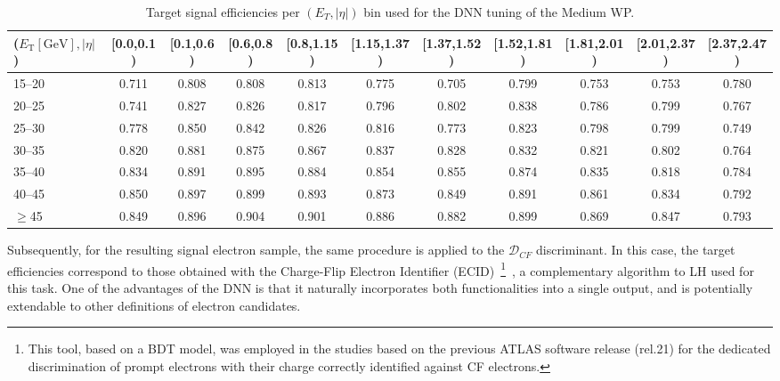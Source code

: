 \begin{table}[htbp]
  \centering
  \caption{Target signal efficiencies per $(E_T, |\eta|)$ bin used for the DNN tuning of the Medium WP.}
  \renewcommand{\arraystretch}{1.2}
  \setlength{\tabcolsep}{0.8pt}
  \scriptsize
  \begin{tabular}{lcccccccccc}
  \toprule
  ($E_{\text{T}}[\text{GeV}],|\eta|$) 
  & \tiny{[0.0,0.1)} & \tiny{[0.1,0.6)} & \tiny{[0.6,0.8)} & \tiny{[0.8,1.15)} & \tiny{[1.15,1.37)} & \tiny{[1.37,1.52)} & \tiny{[1.52,1.81)} & \tiny{[1.81,2.01)} & \tiny{[2.01,2.37)} & \tiny{[2.37,2.47)} \\
  \midrule
  \tiny{15--20}  & 0.711 & 0.808 & 0.808 & 0.813 & 0.775 & 0.705 & 0.799 & 0.753 & 0.753 & 0.780 \\
  \tiny{20--25}  & 0.741 & 0.827 & 0.826 & 0.817 & 0.796 & 0.802 & 0.838 & 0.786 & 0.799 & 0.767 \\
  \tiny{25--30}  & 0.778 & 0.850 & 0.842 & 0.826 & 0.816 & 0.773 & 0.823 & 0.798 & 0.799 & 0.749 \\
  \tiny{30--35}  & 0.820 & 0.881 & 0.875 & 0.867 & 0.837 & 0.828 & 0.832 & 0.821 & 0.802 & 0.764 \\
  \tiny{35--40}  & 0.834 & 0.891 & 0.895 & 0.884 & 0.854 & 0.855 & 0.874 & 0.835 & 0.818 & 0.784 \\
  \tiny{40--45}  & 0.850 & 0.897 & 0.899 & 0.893 & 0.873 & 0.849 & 0.891 & 0.861 & 0.834 & 0.792 \\
  \tiny{$\geq$45} & 0.849 & 0.896 & 0.904 & 0.901 & 0.886 & 0.882 & 0.899 & 0.869 & 0.847 & 0.793 \\
  \bottomrule
  \end{tabular}
  \label{tab:target_effs}
  \end{table}
  

Subsequently, for the resulting signal electron sample, the same procedure is applied to the $\mathcal{D}_{CF}$ discriminant. In this case, the target efficiencies correspond to those obtained with the Charge-Flip Electron Identifier (ECID)~\footnote{This tool, based on a BDT model, was employed in the studies based on the previous ATLAS software release (rel.21) for the dedicated discrimination of prompt electrons with their charge correctly identified against CF electrons.}~\cite{Aaboud:2657964}, a complementary algorithm to LH used for this task. One of the advantages of the DNN is that it naturally incorporates both functionalities into a single output, and is potentially extendable to other definitions of electron candidates.

